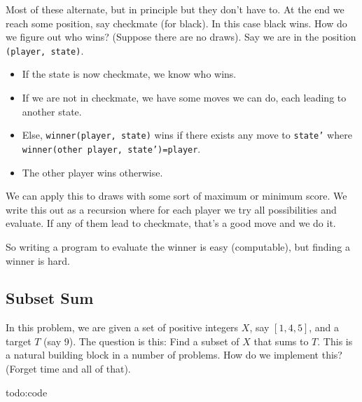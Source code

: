 Most of these alternate, but in principle but they don't have to. At the end we reach some position, say checkmate (for black). In this case black wins. How do we figure out who wins? (Suppose there are no draws). Say we are in the position \texttt{(player, state)}.
\begin{itemize}
\setlength\itemsep{-.2em}
    \item If the state is now checkmate, we know who wins.
    \item If we are not in checkmate, we have some moves we can do, each leading to another state. 
    \item Else, \texttt{winner(player, state)} wins if there exists any move to \texttt{state'} where \texttt{winner(other player, state')=player}.
    \item The other player wins otherwise.
\end{itemize}
We can apply this to draws with some sort of maximum or minimum score. We write this out as a recursion where for each player we try all possibilities and evaluate. If any of them lead to checkmate, that's a good move and we do it. 

So writing a program to evaluate the winner is easy (computable), but finding a winner is hard.

\subsection{Subset Sum}
In this problem, we are given a set of positive integers $X$, say $[1,4,5]$, and a target $T$ (say 9). The question is this: Find a subset of $X$ that sums to $T$. This is a natural building block in a number of problems. How do we implement this? (Forget time and all of that).

{\color{red}todo:code}

